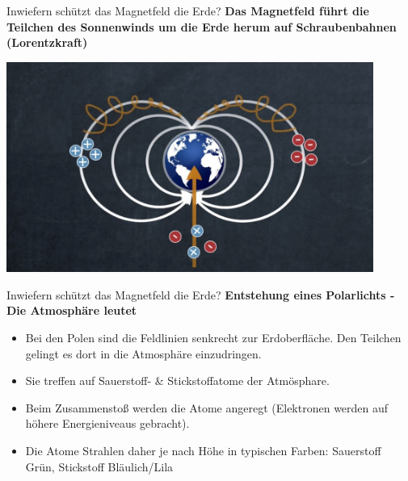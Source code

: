 \documentclass[10pt]{beamer}
\begin{document}
\begin{frame}{Inwiefern schützt das Magnetfeld die Erde?}
\textbf{Das Magnetfeld führt die Teilchen des Sonnenwinds um die Erde herum auf Schraubenbahnen (Lorentzkraft)}
\begin{center}
       \includegraphics[width=0.9\textwidth]{Elektronenbahnen.jpg}
\end{center}
\end{frame}
\begin{frame}{Inwiefern schützt das Magnetfeld die Erde?}
\textbf{Entstehung eines Polarlichts - Die Atmosphäre leutet}\pause
\begin{itemize}
    \item Bei den Polen sind die Feldlinien senkrecht zur Erdoberfläche. Den Teilchen gelingt es dort in die Atmosphäre einzudringen.\pause
\item Sie treffen auf Sauerstoff- \& Stickstoffatome der Atmösphare.\pause
\item Beim Zusammenstoß werden die Atome angeregt (Elektronen werden auf höhere Energieniveaus gebracht).\pause
\item Die Atome Strahlen daher je nach Höhe in typischen Farben: Sauerstoff Grün, Stickstoff Bläulich/Lila  
\end{itemize}
\end{frame}
\end{document}
